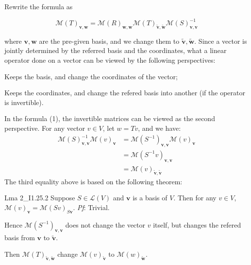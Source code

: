 \documentclass{article}
\newcommand{\basisTilde}[1]{\tilde{\pmb{#1}}}
\begin{document}
Rewrite the formula as

\begin{equation}
    \mathcal{M}(T)_{\pmb{v}, \pmb{w}} = \mathcal{M}(R)_{\pmb{w}, \pmb{w}}\mathcal{M}(T)_{\basisTilde{v}, \basisTilde{w}}\mathcal{M}(S)_{\pmb{v}, \pmb{v}}^{-1} \tag{1}
\end{equation}

where $\pmb{v}, \pmb{w}$ are the pre-given basis, and we change them to $\basisTilde{v}, \basisTilde{w}$. Since a vector is jointly determined by the referred basis and the coordinates, what a linear operator done on a vector can be viewed by the following perspectives:
\begin{compactenum}
    \item Keeps the basis, and change the coordinates of the vector;
    \item Keeps the coordinates, and change the refered basis into another (if the operator is invertible).
\end{compactenum}
In the formula (1), the invertible matrices can be viewed as the second perspective. For any vector $v\in V$, let $w = Tv$, and we have:
$$
\begin{aligned}
    \mathcal{M}(S)^{-1}_{\pmb{v}, \pmb{v}}\mathcal{M}(v)_{\pmb{v}} &= \mathcal{M}(S^{-1})_{\pmb{v}, \pmb{v}}\mathcal{M}(v)_{\pmb{v}} \\
    &= \mathcal{M}(S^{-1}v)_{\pmb{v}, \pmb{v}} \\
    &= \mathcal{M}(v)_{\basisTilde{v}, \basisTilde{v}}
\end{aligned}
$$
The third equality above is based on the following theorem:
\begin{Th}{Lma 2\_I1.25.2}
    Suppose $S\in\mathcal{L}(V)$ and $\pmb{v}$ is a basis of $V$. Then for any $v\in V$, $\mathcal{M}(v)_{\pmb{v}} = \mathcal{M}(Sv)_{S\pmb{v}}$.
    \tcblower
    \textit{Pf}: Trivial.
\end{Th}

Hence $\mathcal{M}(S^{-1})_{\pmb{v}, \pmb{v}}$ does not change the vector $v$ itself, but changes the refered basis from $\pmb{v}$ to $\basisTilde{v}$. 

Then $\mathcal{M}(T)_{\basisTilde{v}, \basisTilde{w}}$ change $\mathcal{M}(v)_{\basisTilde{v}}$ to $\mathcal{M}(w)_{\basisTilde{w}}$. 
\end{document}
